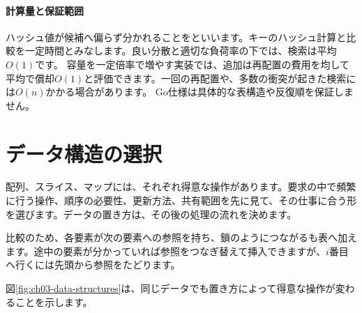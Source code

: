 \paragraph{計算量と保証範囲}
        ハッシュ値が候補へ偏らず分かれることをといいます。キーのハッシュ計算と比較を一定時間とみなします。良い分散と適切な負荷率の下では、検索は平均$O(1)$です。
        容量を一定倍率で増やす実装では、追加は再配置の費用を均して平均で償却$O(1)$と評価できます。一回の再配置や、多数の衝突が起きた検索には$O(n)$かかる場合があります。
        Go仕様は具体的な表構造や反復順を保証しません。

\par
\endgroup
\par
\endgroup


\section{データ構造の選択}
\label{sec:03-runtime-data-17}

配列、スライス、マップには、それぞれ得意な操作があります。要求の中で頻繁に行う操作、順序の必要性、更新方法、共有範囲を先に見て、その仕事に合う形を選びます。データの置き方は、その後の処理の流れを決めます。

比較のため、各要素が次の要素への参照を持ち、鎖のようにつながるも表へ加えます。途中の要素が分かっていれば参照をつなぎ替えて挿入できますが、$i$番目へ行くには先頭から参照をたどります。

図\ref{fig:ch03-data-structures}は、同じデータでも置き方によって得意な操作が変わることを示します。

